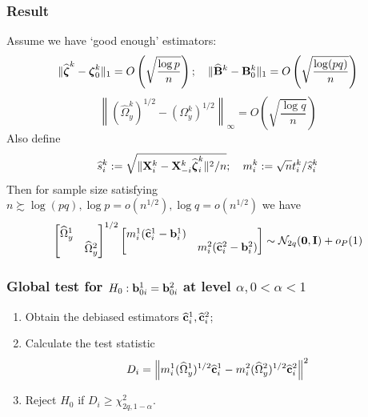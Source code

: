 \documentclass[10pt]{beamer}
\theoremstyle{definition}
\begin{document}
\begin{frame}
\frametitle{Result}
Assume we have `good enough' estimators:
%
\[
\| \widehat {{\boldsymbol{\zeta}}}^k - {\boldsymbol{\zeta}}_0^k \|_1 = O \left( \sqrt { \frac{\log p}{n}} \right); \quad
\| \widehat {{\mathbf{B}}}^k - {\mathbf{B}}^k_0 \|_1 = O \left( \sqrt{\frac{\log (pq)}{n}} \right)
\]
\[
\left\| (\widehat \Omega_y^k)^{1/2} - (\Omega_y^k)^{1/2} \right\|_\infty = O \left( \sqrt { \frac{\log q}{n}} \right)
\]
%
Also define
%
\[
\widehat s_i^k := \sqrt{\| {\mathbf{X}}_i^k - {\mathbf{X}}_{-i}^k \widehat {{\boldsymbol{\zeta}}}_i^k \|^2/n}; \quad
m_i^k := \sqrt n t_i^k / \widehat s_i^k
\]
%
Then for sample size satisfying $n \succsim \log (pq), \log p = o(n^{1/2}), \log q = o(n^{1/2})$ we have
%
\begin{align*}
\begin{bmatrix}
\widehat \Omega_y^1 &\\
& \widehat \Omega_y^2
\end{bmatrix}^{1/2}
%
\begin{bmatrix}
m_i^1 (\widehat \bfc_i^1 - \bfb_i^1) &\\
&  m_i^2 (\widehat \bfc_i^2 - \bfb_i^2)
\end{bmatrix}
\sim \cN_{2q} ({\bf 0}, \bfI) + o_P(1)
\end{align*}

\end{frame}

\begin{frame}
\frametitle{Global test for $H_0: {\bf{b}}_{0 i}^1 = {\bf{b}}_{0 i}^2$ at level $\alpha, 0< \alpha< 1$}
\begin{enumerate}
\item Obtain the debiased estimators $\widehat {{\bf{c}}}_i^1, \widehat {{\bf{c}}}_i^2$;

\item Calculate the test statistic
%
$$
D_i = \left\| m_i^1 (\widehat \Omega_y^1)^{1/2} \widehat {{\bf{c}}}_i^1 - 
 m_i^2 (\widehat \Omega_y^2)^{1/2} \widehat {{\bf{c}}}_i^2 \right\|^2
$$
%

\item Reject $H_0$ if $D_i \geq \chi^2_{2q, 1-\alpha}$.
\end{enumerate}
\end{frame}
\end{document}
